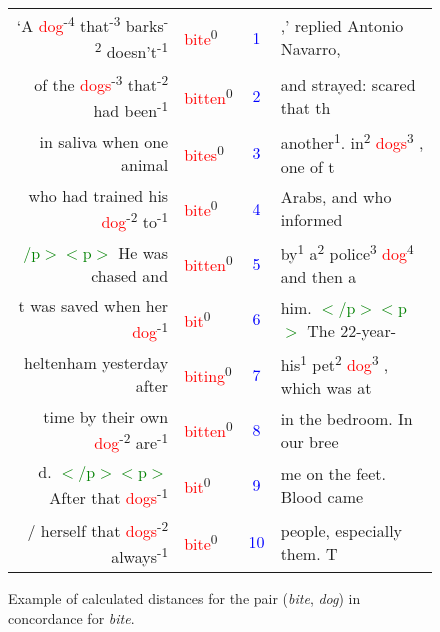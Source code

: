 \documentclass[output=paper]{langsci/langscibook}
\begin{document}
\begin{figure}[b]
\begin{tabular}{rlcl}
`A \textcolor{red}{dog}\textsuperscript{-4} that\textsuperscript{-3} barks\textsuperscript{-2} doesn't\textsuperscript{-1} & \textcolor{red}{bite}\textsuperscript{0} & \textcolor{blue}{1} & ,' replied Antonio Navarro, \\
of the \textcolor{red}{dogs}\textsuperscript{-3} that\textsuperscript{-2} had been\textsuperscript{-1} & \textcolor{red}{bitten}\textsuperscript{0} & \textcolor{blue}{2} & and strayed: scared that th \\
in saliva when one animal & \textcolor{red}{bites}\textsuperscript{0} & \textcolor{blue}{3} & another\textsuperscript{1}. in\textsuperscript{2} \textcolor{red}{dogs}\textsuperscript{3} , one of t \\
who had trained his \textcolor{red}{dog}\textsuperscript{-2} to\textsuperscript{-1} & \textcolor{red}{bite}\textsuperscript{0} & \textcolor{blue}{4} & Arabs, and who informed \\
\textcolor{green}{/p$>$$<$p$>$} He was chased and & \textcolor{red}{bitten}\textsuperscript{0} & \textcolor{blue}{5} & by\textsuperscript{1} a\textsuperscript{2} police\textsuperscript{3} \textcolor{red}{dog}\textsuperscript{4} and then a \\
t was saved when her \textcolor{red}{dog}\textsuperscript{-1} & \textcolor{red}{bit}\textsuperscript{0} & \textcolor{blue}{6} & him. \textcolor{green}{$<$/p$><$p$>$} The 22-year- \\
heltenham yesterday after & \textcolor{red}{biting}\textsuperscript{0} & \textcolor{blue}{7} & his\textsuperscript{1} pet\textsuperscript{2} \textcolor{red}{dog}\textsuperscript{3} , which was at \\
time by their own \textcolor{red}{dog}\textsuperscript{-2} are\textsuperscript{-1} & \textcolor{red}{bitten}\textsuperscript{0} & \textcolor{blue}{8} & in the bedroom. In our bree \\
d. \textcolor{green}{$<$/p$><$p$>$} After that \textcolor{red}{dogs}\textsuperscript{-1} & \textcolor{red}{bit}\textsuperscript{0} & \textcolor{blue}{9} & me on the feet. Blood came \\
/ herself that \textcolor{red}{dogs}\textsuperscript{-2} always\textsuperscript{-1} & \textcolor{red}{bite}\textsuperscript{0} & \textcolor{blue}{10} & people, especially them. T
\end{tabular}
\caption{ Example of calculated distances for the pair (\textit{bite}, \textit{dog}) in
concordance for \textit{bite}.}
\label{fig:04:02}
\end{figure}
\end{document}
